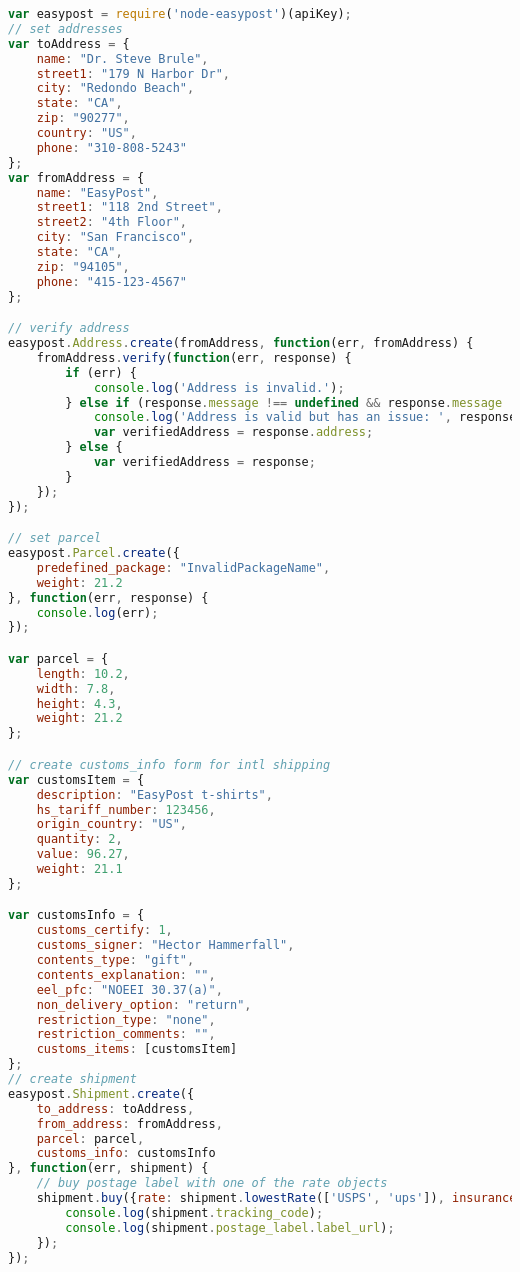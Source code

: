 \begin{lstlisting}[language=javascript]
var easypost = require('node-easypost')(apiKey);
// set addresses
var toAddress = {
    name: "Dr. Steve Brule",
    street1: "179 N Harbor Dr",
    city: "Redondo Beach",
    state: "CA",
    zip: "90277",
    country: "US",
    phone: "310-808-5243"
};
var fromAddress = {
    name: "EasyPost",
    street1: "118 2nd Street",
    street2: "4th Floor",
    city: "San Francisco",
    state: "CA",
    zip: "94105",
    phone: "415-123-4567"
};

// verify address
easypost.Address.create(fromAddress, function(err, fromAddress) {
    fromAddress.verify(function(err, response) {
        if (err) {
            console.log('Address is invalid.');
        } else if (response.message !== undefined && response.message !== null) {
            console.log('Address is valid but has an issue: ', response.message);
            var verifiedAddress = response.address;
        } else {
            var verifiedAddress = response;
        }
    });
});

// set parcel
easypost.Parcel.create({
    predefined_package: "InvalidPackageName",
    weight: 21.2
}, function(err, response) {
    console.log(err);
});

var parcel = {
    length: 10.2,
    width: 7.8,
    height: 4.3,
    weight: 21.2
};

// create customs_info form for intl shipping
var customsItem = {
    description: "EasyPost t-shirts",
    hs_tariff_number: 123456,
    origin_country: "US",
    quantity: 2,
    value: 96.27,
    weight: 21.1
};

var customsInfo = {
    customs_certify: 1,
    customs_signer: "Hector Hammerfall",
    contents_type: "gift",
    contents_explanation: "",
    eel_pfc: "NOEEI 30.37(a)",
    non_delivery_option: "return",
    restriction_type: "none",
    restriction_comments: "",
    customs_items: [customsItem]
};
// create shipment
easypost.Shipment.create({
    to_address: toAddress,
    from_address: fromAddress,
    parcel: parcel,
    customs_info: customsInfo
}, function(err, shipment) {
    // buy postage label with one of the rate objects
    shipment.buy({rate: shipment.lowestRate(['USPS', 'ups']), insurance: 100.00}, function(err, shipment) {
        console.log(shipment.tracking_code);
        console.log(shipment.postage_label.label_url);
    });
});

\end{lstlisting}
